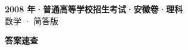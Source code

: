 \documentclass[zihao=-4, a4paper]{ctexart}
\begin{document}
\begin{center}
  {\Large\bfseries 2008 年·普通高等学校招生考试·安徽卷·理科}\\[4pt]
  {\large 数学 · 简答版}
\end{center}
\medskip
{}

\clearpage
{}
\begin{center}{\Large\bfseries 答案速查}\end{center}
\medskip

\end{document}
